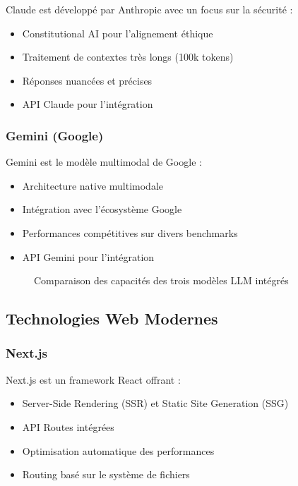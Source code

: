 Claude est développé par Anthropic avec un focus sur la sécurité :
\begin{itemize}
    \item Constitutional AI pour l'alignement éthique
    \item Traitement de contextes très longs (100k tokens)
    \item Réponses nuancées et précises
    \item API Claude pour l'intégration
\end{itemize}

\subsubsection{Gemini (Google)}

Gemini est le modèle multimodal de Google :
\begin{itemize}
    \item Architecture native multimodale
    \item Intégration avec l'écosystème Google
    \item Performances compétitives sur divers benchmarks
    \item API Gemini pour l'intégration
\end{itemize}

\begin{figure}[H]
    \centering
    \caption{Comparaison des capacités des trois modèles LLM intégrés}
    \label{fig:comparaison-llm}
\end{figure}

\subsection{Technologies Web Modernes}

\subsubsection{Next.js}

Next.js est un framework React offrant :
\begin{itemize}
    \item Server-Side Rendering (SSR) et Static Site Generation (SSG)
    \item API Routes intégrées
    \item Optimisation automatique des performances
    \item Routing basé sur le système de fichiers
\end{itemize}

